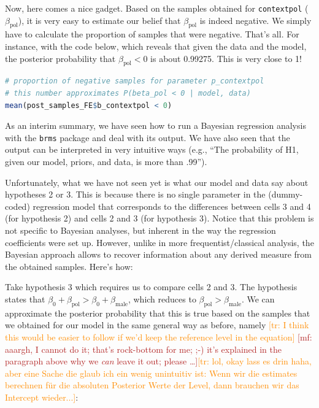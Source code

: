 \documentclass[nobib]{tufte-handout}
\renewcommand{\mf}[1]{\textcolor{firebrick}{[mf: #1]}}
\newcommand{\tr}[1]{\textcolor{DarkOrange}{[tr: #1]}}
\begin{document}
Now, here comes a nice gadget. Based on the samples obtained for \texttt{contextpol} ($\beta_{\text{pol}}$), it is very easy to estimate our belief that $\beta_{\text{pol}}$ is indeed negative. We simply have to calculate the proportion of samples that were negative. That's all. For instance, with the code below, which reveals that given the data and the model, the posterior probability that $\beta_{\text{pol}} < 0$ is about 0.99275. This is very close to 1!  

\begin{minipage}[]{\textwidth}
\begin{lstlisting}[language=R]
# proportion of negative samples for parameter p_contextpol
# this number approximates P(beta_pol < 0 | model, data)
mean(post_samples_FE$b_contextpol < 0)
\end{lstlisting}
\end{minipage}

As an interim summary, we have seen how to run a Bayesian regression analysis with the \texttt{brms} package and deal with its output. We have also seen that the output can be interpreted in very intuitive ways (e.g., ``The probability of H1, given our model, priors, and data, is more than .99'').

Unfortunately, what we have not seen yet is what our model and data say about hypotheses 2 or 3. This is because there is no single parameter in the (dummy-coded) regression model that corresponds to the differences between cells 3 and 4 (for hypothesis 2) and cells 2 and 3 (for hypothesis 3). Notice that this problem is not specific to Bayesian analyses, but inherent in the way the regression coefficients were set up.
%
%
However, unlike in more frequentist/classical analysis, the Bayesian approach allows to recover information about any derived measure from the obtained samples. Here's how:

Take hypothesis 3 which requires us to compare cells 2 and 3. The hypothesis states that
$\beta_0 + \beta_{\text{pol}} > \beta_0 + \beta_{\text{male}}$, which reduces to
$\beta_{\text{pol}} > \beta_{\text{male}}$. We can approximate the posterior probability that
this is true based on the samples that we obtained for our model in the same general way as
before, namely \tr{I think this would be easier to follow if we'd keep the reference level in
  the equation} \mf{aaargh, I cannot do it; that's rock-bottom for me; ;-) it's explained in
  the paragraph above why we \emph{can} leave it out; please \dots}\tr{lol, okay lass es drin haha, aber eine Sache die glaub ich ein wenig unintuitiv ist: Wenn wir die estimates berechnen für die absoluten Posterior Werte der Level,  dann brauchen wir das Intercept wieder...}:
\end{document}
